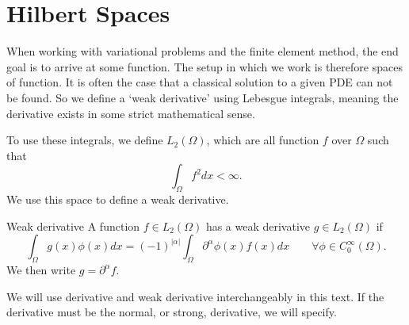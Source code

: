 \section{Hilbert Spaces}
When working with variational problems and the finite 
element method, the end goal is to arrive at some function.
The setup in which we work is therefore spaces of function. 
It is often the case that a classical solution to a given PDE can 
not be found. 
So we define a `weak derivative' using Lebesgue integrals, meaning 
the derivative exists in some strict mathematical sense. 

To use these integrals, we define $L_2(\Omega)$, which are all 
function $f$ over $\Omega$ such that 
\begin{equation*}
   \int_\Omega f^2 dx < \infty. 
\end{equation*}
We use this space to define a weak derivative.
\begin{defn}{Weak derivative}
    A function $f \in L_2(\Omega)$ has a weak derivative $g \in L_2(\Omega)$
    if
    \begin{equation*}
        \int_\Omega g(x)\phi(x) dx = {(-1)}^{|\alpha|}\int_\Omega 
        \partial ^{\alpha}\phi(x) f(x) dx
        \quad\quad \forall \phi \in C^\infty_0(\Omega).
    \end{equation*}
    We then write $g=\partial ^{\alpha}f$.\label{def:weak_derivative}
\end{defn}
We will use derivative and weak derivative interchangeably in this 
text.
If the derivative must be the normal, or strong, derivative, we will 
specify. 

